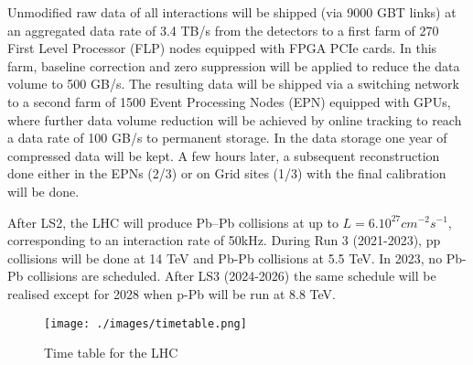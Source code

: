 Unmodified raw data of all interactions will be shipped (via 9000 GBT links) at an aggregated data rate of 3.4 TB/s from the detectors to a first farm of 270 First Level Processor (FLP) nodes equipped with FPGA PCIe cards. In this farm, baseline correction and zero suppression will be applied to reduce the data volume to 500 GB/s. The resulting data will be shipped via a switching network to a second farm of 1500 Event Processing Nodes (EPN) equipped with GPUs, where further data volume reduction will be achieved by online tracking to reach a data rate of 100 GB/s to permanent storage. In the data storage one year of compressed data will be kept. A few hours later, a subsequent reconstruction done either in the EPNs (2/3) or on Grid sites (1/3) with the final calibration will be done.

After LS2, the LHC will produce Pb–Pb collisions at up to $L = 6.10^{27} cm^{-2} s^{-1}$, corresponding to an interaction rate of 50kHz. During Run 3 (2021-2023), pp collisions will be done at 14 TeV and Pb-Pb collisions at 5.5 TeV. In 2023, no Pb-Pb collisions are scheduled. After LS3 (2024-2026) the same schedule will be realised except for 2028 when p-Pb will be run at 8.8 TeV.

\begin{figure}[h]
  \begin{center}
    \texttt{[image: ./images/timetable.png]}
    \caption{Time table for the LHC}
    \label{fig:timetable}
  \end{center}
\end{figure}


